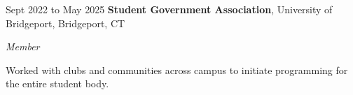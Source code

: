     \vspace{0.10 cm}

    \begin{twocolentry}{Sept 2022 to May 2025}
        \textbf{Student Government Association}, University of Bridgeport, Bridgeport, CT
    \end{twocolentry}
    \textit{Member}
    \vspace{0.10 cm}
    \begin{onecolentry}
        \begin{highlights}
            \item Worked with clubs and communities across campus to initiate programming for the entire student body.
        \end{highlights}
    \end{onecolentry}